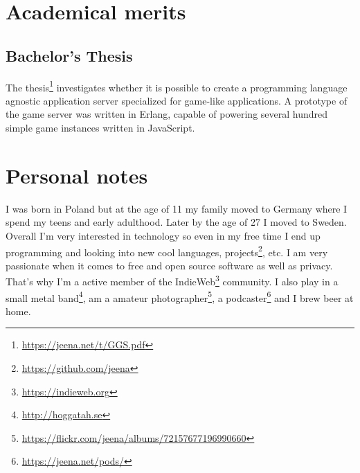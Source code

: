 \documentclass{twocolcv}
\begin{document}
\section*{Academical merits}

\subsection*{Bachelor's Thesis}
The thesis\footnote{\url{https://jeena.net/t/GGS.pdf}} investigates whether it is possible to create a programming language agnostic application server specialized for game-like applications. A prototype of the game server was written in Erlang, capable of powering several hundred simple game instances written in JavaScript.

\section*{Personal notes}
  {I was born in Poland but at the age of 11 my family moved to Germany where I spend my teens and early adulthood. Later by the age of 27 I moved to Sweden.}
  {Overall I'm very interested in technology so even in my free time I end up programming and looking into new cool languages, projects\footnote{\url{https://github.com/jeena}}, etc. I am very passionate when it comes to free and open source software as well as privacy. That's why I'm a active member of the IndieWeb\footnote{\url{https://indieweb.org}} community.}
  {I also play in a small metal band\footnote{\url{http://hoggatah.se}}, am a amateur photographer\footnote{\url{https://flickr.com/jeena/albums/72157677196990660}}, a podcaster\footnote{\url{https://jeena.net/pods/}} and I brew beer at home.}
\end{document}
